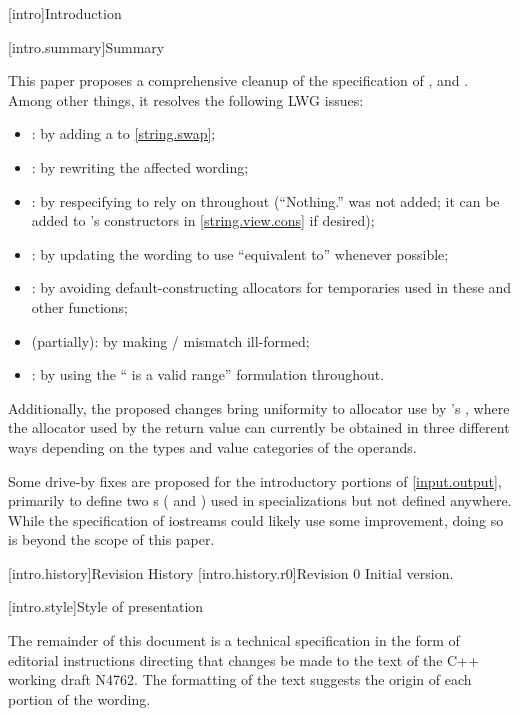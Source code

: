 [intro]{Introduction}

[intro.summary]{Summary}

\pnum
This paper proposes a comprehensive cleanup of the specification of 
,  and .
Among other things, it resolves the following LWG issues:
\begin{itemize}
\item {}: by adding a \expects to \ref{string.swap};
\item {}: by rewriting the affected wording;
\item {}: by respecifying to rely on  throughout (``\throws Nothing.'' was not added;
it can be added to 's constructors in \ref{string.view.cons} if desired);
\item {}: by updating the wording to use ``equivalent to'' whenever possible;
\item {}: by avoiding default-constructing allocators for temporaries used in these and other functions;
\item {} (partially): by making / mismatch ill-formed;
\item {}: by using the `` is a valid range'' formulation throughout.
\end{itemize}

\pnum
Additionally, the proposed changes bring uniformity to allocator use by 
's , where the allocator used by the
return value can currently be obtained in three different ways depending
on the types and value categories of the operands. 

\pnum
Some drive-by fixes are proposed for the introductory portions of \ref{input.output},
primarily to define two s 
( and )
used in  specializations but not defined anywhere. 
While the specification of iostreams could likely use some improvement,
doing so is beyond the scope of this paper.

[intro.history]{Revision History}
[intro.history.r0]{Revision 0}
Initial version.

[intro.style]{Style of presentation}

\pnum
The remainder of this document is a technical specification in the form of
editorial instructions directing that changes be made to the text of the C++
working draft N4762. The formatting of the text suggests the origin of each 
portion of the wording.

